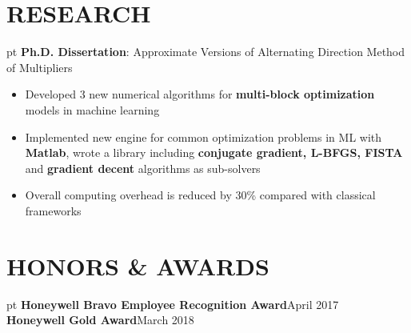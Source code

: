 \documentclass[10.5pt]{res} %
\begin{document}
\begin{resume}
\section{RESEARCH}  pt
	\textbf{Ph.D. Dissertation}: Approximate Versions of Alternating Direction Method of Multipliers
	\begin{itemize} pt
		\item Developed 3 new %
		 numerical algorithms for \textbf{multi-block optimization} models in machine learning  %
		\item Implemented new engine for common optimization problems in ML with \textbf{Matlab}, wrote a library including \textbf{conjugate gradient, L-BFGS, FISTA} and \textbf{gradient decent} algorithms as sub-solvers
		\item Overall computing overhead is reduced by 30\% compared with classical frameworks
	\end{itemize}
%
\section{HONORS \& AWARDS}  pt  
\textbf{Honeywell Bravo Employee Recognition Award}\hfill April 2017\\
\textbf{Honeywell Gold Award}\hfill March 2018
%

\end{resume}
\end{document}
